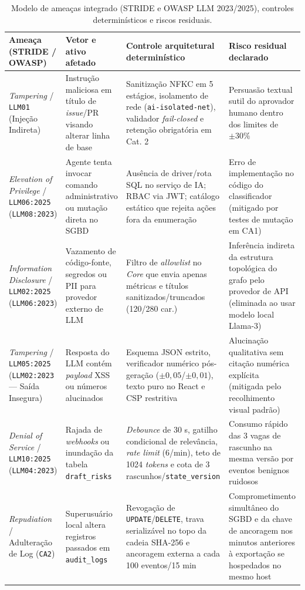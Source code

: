 \documentclass[12pt,openany,oneside,a4paper,english,brazilian,sumario=tradicional]{abntex2}
\newcommand{\fonteautores}{\par\vspace{1mm}{\small Fonte: Elaborado pelos autores (2026).}}
\begin{document}
\begin{table}[htbp]
\caption{Modelo de ameaças integrado (STRIDE e OWASP LLM 2023/2025), controles determinísticos e riscos residuais.}\label{tab:stride_owasp}
\scriptsize
\begin{tabularx}{\textwidth}{L{2.5cm} L{2.8cm} Y Y}
\toprule
\textbf{Ameaça (STRIDE / OWASP)} & \textbf{Vetor e ativo afetado} & \textbf{Controle arquitetural determinístico} & \textbf{Risco residual declarado}\\
\midrule
\textit{Tampering} / \texttt{LLM01} (Injeção Indireta) & Instrução maliciosa em título de \textit{issue}/PR visando alterar linha de base & Sanitização NFKC em 5 estágios, isolamento de rede (\texttt{ai-isolated-net}), validador \textit{fail-closed} e retenção obrigatória em Cat. 2 & Persuasão textual sutil do aprovador humano dentro dos limites de $\pm 30\%$\\
\textit{Elevation of Privilege} / \texttt{LLM06:2025} (\texttt{LLM08:2023}) & Agente tenta invocar comando administrativo ou mutação direta no SGBD & Ausência de driver/rota SQL no serviço de IA; RBAC via JWT; catálogo estático que rejeita ações fora da enumeração & Erro de implementação no código do classificador (mitigado por testes de mutação em CA1)\\
\textit{Information Disclosure} / \texttt{LLM02:2025} (\texttt{LLM06:2023}) & Vazamento de código-fonte, segredos ou PII para provedor externo de LLM & Filtro de \textit{allowlist} no \textit{Core} que envia apenas métricas e títulos sanitizados/truncados (120/280 car.) & Inferência indireta da estrutura topológica do grafo pelo provedor de API (eliminada ao usar modelo local Llama-3)\\
\textit{Tampering} / \texttt{LLM05:2025} (\texttt{LLM02:2023} --- Saída Insegura) & Resposta do LLM contém \textit{payload} XSS ou números alucinados & Esquema JSON estrito, verificador numérico pós-geração ($\pm 0{,}05$/$\pm 0{,}01$), texto puro no React e CSP restritiva & Alucinação qualitativa sem citação numérica explícita (mitigada pelo recolhimento visual padrão)\\
\textit{Denial of Service} / \texttt{LLM10:2025} (\texttt{LLM04:2023}) & Rajada de \textit{webhooks} ou inundação da tabela \texttt{draft\_risks} & \textit{Debounce} de 30 s, gatilho condicional de relevância, \textit{rate limit} (6/min), teto de 1024 \textit{tokens} e cota de 3 rascunhos/\texttt{state\_version} & Consumo rápido das 3 vagas de rascunho na mesma versão por eventos benignos ruidosos\\
\textit{Repudiation} / Adulteração de Log (\texttt{CA2}) & Superusuário local altera registros passados em \texttt{audit\_logs} & Revogação de \texttt{UPDATE}/\texttt{DELETE}, trava serializável no topo da cadeia SHA-256 e ancoragem externa a cada 100 eventos/15 min & Comprometimento simultâneo do SGBD e da chave de ancoragem nos minutos anteriores à exportação se hospedados no mesmo host\\
\bottomrule
\end{tabularx}
\fonteautores
\end{table}
\end{document}

